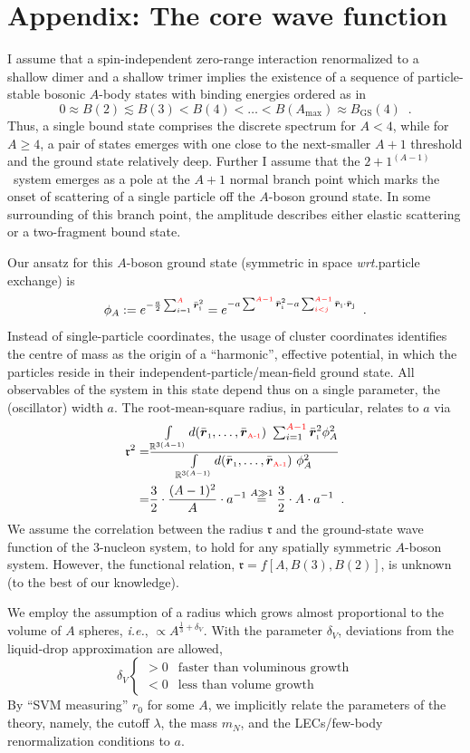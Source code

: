 \documentclass[onecolumn,preprint,superscriptaddress,nofootinbib,notitlepage,10pt,linenumbers]{revtex4-1}
\newcommand{\red}[1]{\textcolor{red}{#1}}
\newcommand{\la}{\label}
\newcommand{\be}{\begin{equation}}
\newcommand{\ee}{\end{equation}}
\newcommand{\vcl}[1]{\ensuremath{\bar{\boldsymbol{r}}_\text{\tiny #1}}}
\newcommand{\ie}{\textit{i.e.}\;}
\newcommand{\wrt}{\textit{wrt.}\;}
\newcommand{\abb}{\ensuremath{2\!+\!1^{(A-1)}}}
\begin{document}
\section{Appendix: The core wave function}
I assume that a spin-independent zero-range interaction renormalized to a shallow dimer and a shallow trimer
implies the existence of a sequence of particle-stable bosonic $A$-body states with binding energies
ordered as in
\be\la{eq:be_ordering}
0\approx B(2)\lesssim B(3)<B(4)<\ldots<B(A_\text{max})\approx B_\text{GS}(4)\;\;.
\ee
Thus, a single bound state comprises the discrete spectrum for $A<4$, while for $A\geq 4$, a pair of states emerges
with one close to the next-smaller $A+1$ threshold and the ground state relatively deep.
Further I assume that the \abb~system emerges as a pole at the $A+1$ normal branch point which marks the onset of
scattering of a single particle off the $A$-boson ground state. In some surrounding of this branch point, the amplitude
describes either elastic scattering or a two-fragment bound state. 

Our ansatz for this $A$-boson ground state
(symmetric in space \wrt particle exchange) is
\be
\phi_A:=e^{-\frac{a}{2}\sum_{i=1}^{\red{A}}\vcl{i}^2}=e^{-a\sum^{\red{A-1}}\vcl{i}^2-a\sum^{\red{A-1}}_{\red{i<j}}\vcl{i}\cdot\vcl{j}}\la{eq.wfktphi}\;\;.
\ee
Instead of single-particle coordinates, the usage of cluster coordinates identifies
the centre of mass as the origin of a ``harmonic'', effective potential, in which the
particles reside in their independent-particle/mean-field ground state. All observables
of the system in this state depend thus on a single
parameter, the (oscillator) width $a$. The root-mean-square radius, in particular, relates to
$a$ via
\begin{align}
\mathfrak{r}^2=&\frac{\int\limits_{\mathbb{R}^{3(A-1)}}d(\vcl{1},\ldots,\vcl{\red{A-1}})~
\sum_{i=1}^{\red{A-1}}\vcl{i}^2\phi_A^2}
{\int\limits_{\mathbb{R}^{3(A-1)}}d(\vcl{1},\ldots,\vcl{\red{A-1}})~\phi_A^2}\\
=&\frac{3}{2}\cdot\frac{(A-1)^2}{A}\cdot a^{-1}\stackrel{A\gg 1}{=}
\frac{3}{2}\cdot A\cdot a^{-1}\;\;.
\end{align}
We assume the correlation between the radius $\mathfrak{r}$ and the ground-state wave function of the
$3$-nucleon system, to hold for any spatially symmetric $A$-boson system. However, the functional
relation, $\mathfrak{r}=f\left[A,B(3),B(2)\right]$, is unknown (to the best of our knowledge).

We employ the assumption of a radius which grows almost proportional to the volume of
$A$ spheres, \ie, $\propto A^{\frac{1}{3}+\delta_V}$.
With the parameter $\delta_V$, deviations from the liquid-drop approximation are allowed,
$$
\delta_V\left\lbrace
\begin{array}{cl} >0 & \text{faster than voluminous growth}\\ 
                 <0 & \text{less than volume growth}
\end{array}\right.
$$
By ``SVM measuring'' $r_0$ for some $A$, we
implicitly relate the parameters of the theory, namely, the cutoff $\lambda$, the mass $m_N$, and
the LECs/few-body renormalization conditions to $a$.
\end{document}
